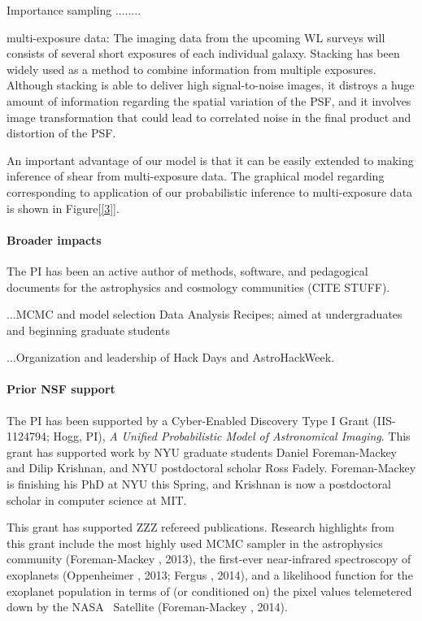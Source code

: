\documentclass[12pt]{article}
\begin{document}
Importance sampling ........

multi-exposure data:
The imaging data from the upcoming WL surveys will consists of several
short exposures of each individual galaxy. Stacking has been widely used
as a method to combine information from multiple exposures. 
Although stacking is able to deliver high signal-to-noise images, it distroys a
huge amount of information regarding the spatial variation of
the PSF, and it involves image transformation that could lead to correlated noise
in the final product and distortion of the PSF.

An important advantage of our model is that it can be easily extended
to making inference of shear from multi-exposure data. The graphical model 
regarding corresponding to application of our probabilistic inference to
multi-exposure data is shown in Figure[\ref{3}].

\paragraph{Broader impacts}

The PI has been an active author of methods, software, and pedagogical
documents for the astrophysics and cosmology communities (CITE STUFF).

...MCMC and model selection Data Analysis Recipes; aimed at undergraduates and beginning graduate students

...Organization and leadership of Hack Days and AstroHackWeek.

\paragraph{Prior NSF support}

The PI has been supported by a Cyber-Enabled Discovery Type I Grant
(IIS-1124794; Hogg, PI), \textit{A Unified Probabilistic Model of
  Astronomical Imaging}.
This grant has supported work by NYU graduate students Daniel
Foreman-Mackey and Dilip Krishnan, and NYU postdoctoral scholar Ross
Fadely.
Foreman-Mackey is finishing his PhD at NYU this Spring, and Krishnan
is now a postdoctoral scholar in computer science at MIT.

This grant has supported ZZZ refereed publications.
Research highlights from this grant include the most highly used MCMC
sampler in the astrophysics community (Foreman-Mackey \etal, 2013), the
first-ever near-infrared spectroscopy of exoplanets (Oppenheimer \etal, 2013;
Fergus \etal, 2014), and a likelihood function for the exoplanet population
in terms of (or conditioned on) the pixel values telemetered down by
the NASA \kepler\ Satellite (Foreman-Mackey \etal, 2014).
\end{document}
